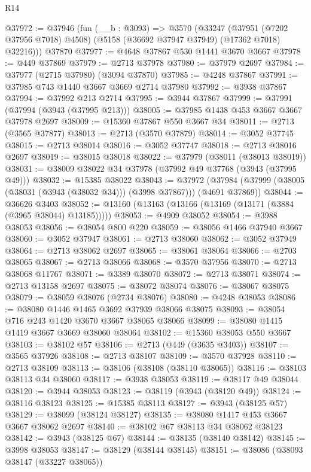\begin{lexlean}{R14}
\begin{coremodule}
@37972 := @37946
    (fun (__b : @3093) =>
    @3570
      (@33247
        (@37951 (@7202 @37956 @7018) @4508)
        (@5158 (@36692 @37947 @37949) (@17362 @7018) @32216)))
    @37870
@37977 := @4648 @37867 @530 @1441 @3670 @3667
@37978 := @449 @37869
@37979 := @2713 @37978
@37980 := @37979 @2697
@37984 := @37977 (@2715 @37980) (@3094 @37870)
@37985 := @4248 @37867
@37991 := @37985 @743 @1440 @3667 @3669 @2714 @37980
@37992 := @3938 @37867
@37994 := @37992 @213 @2714
@37995 := @3944 @37867
@37999 := @37991 (@37994 (@3943 (@37995 @213)))
@38005 := @37985 @1438 @453 @3667 @3667 @37978 @2697
@38009 := @15360 @37867 @550 @3667 @34
@38011 := @2713 (@3565 @37877)
@38013 := @2713 (@3570 @37879)
@38014 := @3052 @37745
@38015 := @2713 @38014
@38016 := @3052 @37747
@38018 := @2713 @38016 @2697
@38019 := @38015 @38018
@38022 := @37979 (@38011 (@38013 @38019))
@38031 := @38009 @38022 @34 @37978 (@37992 @49 @37768 (@3943 (@37995 @49)))
@38032 := @15385 @38022
@38043 := @37972
    (@37984 (@37999 (@38005 (@38031 (@3943 (@38032 @34))) (@3998 @37867))) (@4691 @37869))
@38044 := @36626 @3403
@38052 := @13160 (@13163 (@13166 (@13169 (@13171 (@3884 (@3965 @38044) @13185)))))
@38053 := @4909 @38052
@38054 := @3988 @38053
@38056 := @38054 @800 @220
@38059 := @38056 @1466 @37940 @3667
@38060 := @3052 @37947
@38061 := @2713 @38060
@38062 := @3052 @37949
@38064 := @2713 @38062 @2697
@38065 := @38061 @38064
@38066 := @2703 @38065
@38067 := @2713 @38066
@38068 := @3570 @37956
@38070 := @2713 @38068 @11767
@38071 := @3389 @38070
@38072 := @2713 @38071
@38074 := @2713 @13158 @2697
@38075 := @38072 @38074
@38076 := @38067 @38075
@38079 := @38059 @38076 (@2734 @38076)
@38080 := @4248 @38053
@38086 := @38080 @1446 @1465 @3692 @37939 @38066 @38075
@38093 := @38054 @716 @243 @1420 @3670 @3667 @38065 @38066
@38099 := @38080 @1415 @1419 @3667 @3669 @38060 @38064
@38102 := @15360 @38053 @550 @3667
@38103 := @38102 @57
@38106 := @2713 (@449 (@3635 @3403))
@38107 := @3565 @37926
@38108 := @2713 @38107
@38109 := @3570 @37928
@38110 := @2713 @38109
@38113 := @38106 (@38108 (@38110 @38065))
@38116 := @38103 @38113 @34 @38060
@38117 := @3938 @38053
@38119 := @38117 @49 @38044
@38120 := @3944 @38053
@38123 := @38119 (@3943 (@38120 @49))
@38124 := @38116 @38123
@38125 := @15385 @38113
@38127 := @3943 (@38125 @57)
@38129 := @38099 (@38124 @38127)
@38135 := @38080 @1417 @453 @3667 @3667 @38062 @2697
@38140 := @38102 @67 @38113 @34 @38062 @38123
@38142 := @3943 (@38125 @67)
@38144 := @38135 (@38140 @38142)
@38145 := @3998 @38053
@38147 := @38129 (@38144 @38145)
@38151 := @38086 (@38093 @38147 (@33227 @38065))

\end{coremodule}
\end{lexlean}
